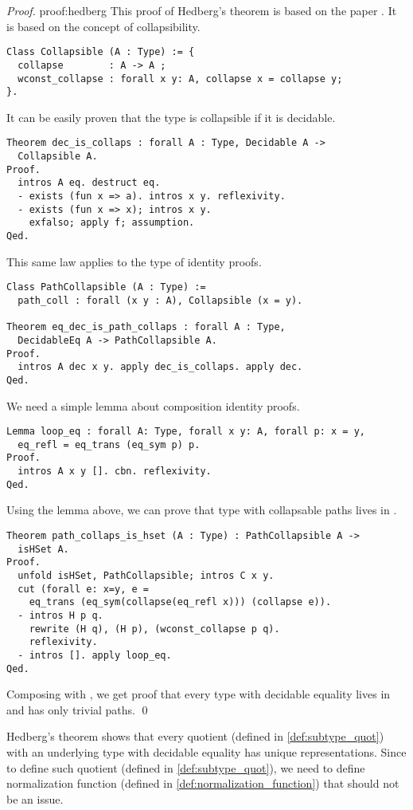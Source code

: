 \begin{proof}{}{proof:hedberg}
This proof of Hedberg's theorem is based on the paper \cite{HedbergProof}. It is based on the concept of collapsibility.
\begin{verbatim}
Class Collapsible (A : Type) := { 
  collapse        : A -> A ;
  wconst_collapse : forall x y: A, collapse x = collapse y;
}.
\end{verbatim}
It can be easily proven that the type is collapsible if it is decidable.
\begin{verbatim}
Theorem dec_is_collaps : forall A : Type, Decidable A -> 
  Collapsible A.
Proof.
  intros A eq. destruct eq.
  - exists (fun x => a). intros x y. reflexivity.
  - exists (fun x => x); intros x y.
    exfalso; apply f; assumption.
Qed.
\end{verbatim}
This same law applies to the type of identity proofs.
\begin{verbatim}
Class PathCollapsible (A : Type) :=
  path_coll : forall (x y : A), Collapsible (x = y).

Theorem eq_dec_is_path_collaps : forall A : Type, 
  DecidableEq A -> PathCollapsible A.
Proof.
  intros A dec x y. apply dec_is_collaps. apply dec.
Qed.
\end{verbatim}
We need a simple lemma about composition identity proofs.
\begin{verbatim}
Lemma loop_eq : forall A: Type, forall x y: A, forall p: x = y, 
  eq_refl = eq_trans (eq_sym p) p.
Proof.
  intros A x y []. cbn. reflexivity.
Qed.
\end{verbatim}
Using the lemma above, we can prove that type with collapsable paths lives in .
\begin{verbatim}
Theorem path_collaps_is_hset (A : Type) : PathCollapsible A -> 
  isHSet A.
Proof.
  unfold isHSet, PathCollapsible; intros C x y.
  cut (forall e: x=y, e = 
    eq_trans (eq_sym(collapse(eq_refl x))) (collapse e)).
  - intros H p q. 
    rewrite (H q), (H p), (wconst_collapse p q).
    reflexivity.
  - intros []. apply loop_eq.
Qed.
\end{verbatim}
Composing  with , we get proof that every type with decidable equality lives in  and has only trivial paths. \qed
\end{proof}
Hedberg's theorem shows that every quotient (defined in \ref{def:subtype_quot}) with an underlying type with decidable equality has unique representations. Since to define such quotient (defined in \ref{def:subtype_quot}), we need to define normalization function (defined in \ref{def:normalization_function}) that should not be an issue.
